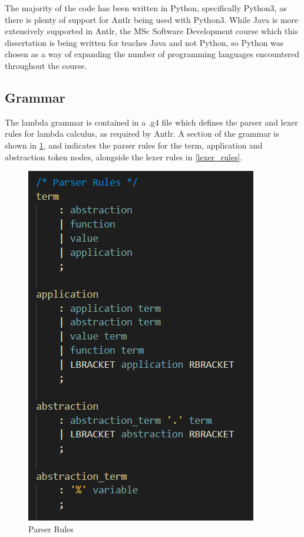 \documentclass[a4paper,12pt]{report}
\begin{document}
The majority of the code has been written in Python, specifically Python3, as there is plenty of support for Antlr being used with Python3. While Java is more extensively supported in Antlr, the MSc Software Development course which this dissertation is being written for teaches Java and not Python, so Python was chosen as a way of expanding the number of programming languages encountered throughout the course.

\subsection{Grammar}

The lambda grammar is contained in a .g4 file which defines the parser and lexer rules for lambda calculus, as required by Antlr. A section of the grammar is shown in \ref{parser_rules}, and indicates the parser rules for the term, application and abstraction token nodes, alongside the lexer rules in \ref{lexer_rules}.

\begin{figure}[p]
\centering
\includegraphics{images/parser_rules}
\caption{Parser Rules}
\label{parser_rules}
\end{figure}
\end{document}

